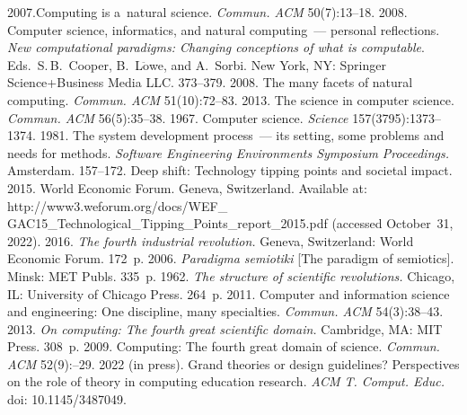 {\begin{multicols}{2}
{\small\frenchspacing
 {%
 \begin{thebibliography}{99}
 2007.Computing is a~natural science. \textit{Commun. ACM} 
50(7):13--18.
 2008. 
Computer science, informatics, and natural computing~--- personal reflections. 
\textit{New computational paradigms: Changing conceptions of 
what is computable}. Eds.\ S.\,B.~Cooper, 
B.~L$\ddot{\mbox{o}}$we, and A.~Sorbi. New York, NY: Springer 
Science\;+\;Business Media LLC. 373--379.
 2008. 
The many facets of natural computing. \textit{Commun. ACM} 51(10):72--83.
 2013. 
The science in computer science. \textit{Commun. ACM} 56(5):35--38.
 1967. 
Computer science. \textit{Science} 157(3795):1373--1374.
 1981. The system development 
process~--- its setting, some problems and needs for methods. \textit{Software 
Engineering Environments Symposium Proceedings.} Amsterdam. 157--172.
Deep shift: Technology tipping points and societal impact. 2015. World 
Economic Forum. Geneva, Switzerland. Available at: {\sf 
http://www3.weforum.org/docs/WEF\_ GAC15\_Technological\_Tipping\_Points\_report\_2015.pdf} (accessed 
October~31, 2022).
 2016. \textit{The fourth industrial revolution.} Geneva, 
Switzerland: World Economic Forum. 172~p.
 2006. \textit{Paradigma semiotiki} [The paradigm of 
semiotics]. Minsk: MET Publs. 335~p.
 1962. \textit{The structure of scientific revolutions.} Chicago, IL: 
University of Chicago Press. 264~p.
 2011. Computer and information science and engineering: One 
discipline, many specialties. \textit{Commun. ACM} 54(3):38--43.
 2013. \textit{On computing: The fourth great scientific 
domain.} Cambridge, MA: MIT Press. 308~p.
 2009. Computing: The fourth great 
domain of science. \textit{Commun. ACM} 52(9):--29.
 2022 (in press). Grand theories or design 
guidelines? Perspectives on the role of theory in computing education research. 
\textit{ACM T. Comput. Educ.} doi: 10.1145/3487049.



\end{thebibliography}}}
\end{multicols}}
